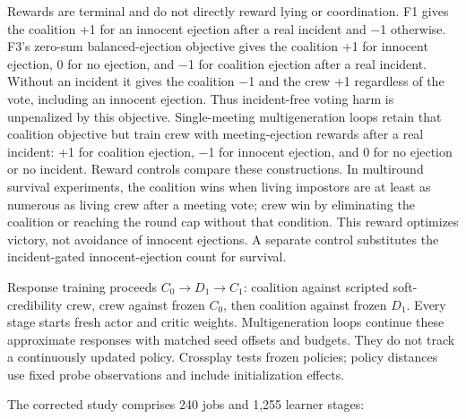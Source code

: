 \documentclass[
  12pt,
]{article}
\begin{document}
Rewards are terminal and do not directly reward lying or coordination.
F1 gives the coalition +1 for an innocent ejection after a real incident
and −1 otherwise. F3's zero-sum balanced-ejection objective gives the
coalition +1 for innocent ejection, 0 for no ejection, and −1 for
coalition ejection after a real incident. Without an incident it gives
the coalition −1 and the crew +1 regardless of the vote, including an
innocent ejection. Thus incident-free voting harm is unpenalized by this
objective. Single-meeting multigeneration loops retain that coalition
objective but train crew with meeting-ejection rewards after a real
incident: +1 for coalition ejection, −1 for innocent ejection, and 0 for
no ejection or no incident. Reward controls compare these constructions.
In multiround survival experiments, the coalition wins when living
impostors are at least as numerous as living crew after a meeting vote;
crew win by eliminating the coalition or reaching the round cap without
that condition. This reward optimizes victory, not avoidance of innocent
ejections. A separate control substitutes the incident-gated
innocent-ejection count for survival.

Response training proceeds \(C_0\rightarrow D_1\rightarrow C_1\):
coalition against scripted soft-credibility crew, crew against frozen
\(C_0\), then coalition against frozen \(D_1\). Every stage starts fresh
actor and critic weights. Multigeneration loops continue these
approximate responses with matched seed offsets and budgets. They do not
track a continuously updated policy. Crossplay tests frozen policies;
policy distances use fixed probe observations and include initialization
effects.

The corrected study comprises 240 jobs and 1,255 learner stages:

\FloatBarrier
\end{document}
